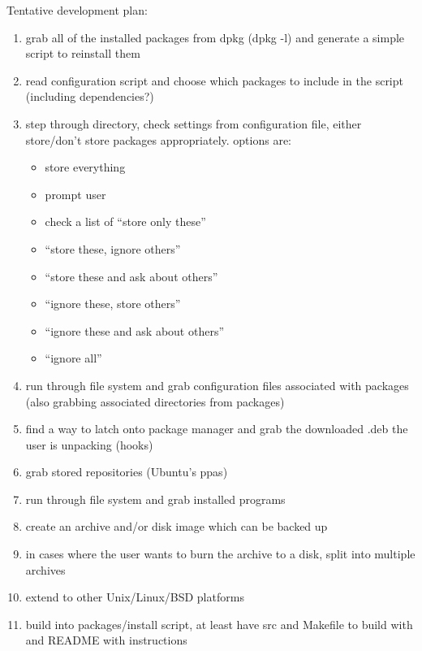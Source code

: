 \documentclass[10pt]{article}
\begin{document}
        Tentative development plan:
        \begin{enumerate}
            \item grab all of the installed packages from dpkg (dpkg -l) and generate a simple script to reinstall them
            \item read configuration script and choose which packages to include in the script (including dependencies?)
            \item step through directory, check settings from configuration file, either store/don't store packages appropriately. options are: \begin{itemize}
                \item store everything
                \item prompt user
                \item check a list of ``store only these''
                \item ``store these, ignore others''
                \item ``store these and ask about others''
                \item ``ignore these, store others''
                \item ``ignore these and ask about others''
                \item ``ignore all''
            \end{itemize}
            \item run through file system and grab configuration files associated with packages (also grabbing associated directories from packages)
            \item find a way to latch onto package manager and grab the downloaded .deb the user is unpacking (hooks)
            \item grab stored repositories (Ubuntu's ppas)
            \item run through file system and grab installed programs
            \item create an archive and/or disk image which can be backed up
            \item in cases where the user wants to burn the archive to a disk, split into multiple archives
            \item extend to other Unix/Linux/BSD platforms
            \item build into packages/install script, at least have src and Makefile to build with and README with instructions
        \end{enumerate}
\end{document}
